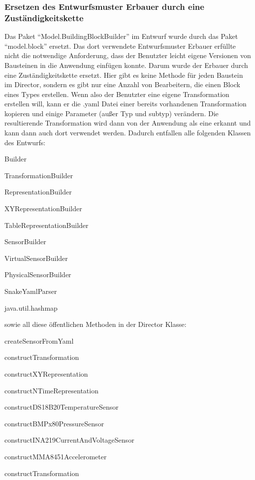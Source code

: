 \documentclass[parskip=full]{scrartcl}
\begin{document}
\subsubsection{Ersetzen des Entwurfsmuster Erbauer durch eine Zuständigkeitskette}
Das Paket "`Model.BuildingBlockBuilder"' im Entwurf wurde durch das Paket "`model.block"' ersetzt. Das dort verwendete Entwurfsmuster Erbauer erfüllte nicht die notwendige Anforderung, dass der Benutzter leicht eigene Versionen von Bausteinen in die Anwendung einfügen konnte. Darum wurde der Erbauer durch eine Zuständigkeitskette ersetzt. Hier gibt es keine Methode für jeden Baustein im Director, sondern es gibt nur eine Anzahl von Bearbeitern, die einen Block eines Types erstellen. Wenn also der Benutzter eine eigene Transformation erstellen will, kann er die .yaml Datei einer bereits vorhandenen Transformation kopieren und einige Parameter (außer Typ und subtyp) verändern. Die resultierende Transformation wird dann von der Anwendung als eine erkannt und kann dann auch dort verwendet werden.
Dadurch entfallen alle folgenden Klassen des Entwurfs:

\begin{description}
\item{} Builder
\item{} TransformationBuilder
\item{} RepresentationBuilder
\item{} XYRepresentationBuilder
\item{} TableRepresentationBuilder
\item{} SensorBuilder
\item{} VirtualSensorBuilder
\item{} PhysicalSensorBuilder
\item{} SnakeYamlParser
\item{} java.util.hashmap
\end{description}

sowie all diese öffentlichen Methoden in der Director Klasse:

\begin{description}
\item{} createSensorFromYaml
\item{} constructTransformation
\item{} constructXYRepresentation
\item{} constructNTimeRepresentation
\item{} constructDS18B20TemperatureSensor
\item{} constructBMPx80PressureSensor
\item{} constructINA219CurrentAndVoltageSensor
\item{} constructMMA8451Accelerometer
\item{} constructTransformation

\end{description}
\end{document}
